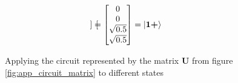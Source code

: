 \begin{figure}[H]
\begin{alignat*}{2}
\begin{bmatrix}
        \end{bmatrix}
        =
        \begin{bmatrix}
            0             \\
            0             \\
            \sqrt{0.5}    \\
            \sqrt{0.5}    \\
        \end{bmatrix}&=\ket{\mathbf{1}\textbf{+}}
    \end{alignat*}
    \caption{Applying the circuit represented by the matrix $\mathbf{U}$ from figure \ref{fig:app_circuit_matrix} to different states}
    \label{fig:app_applying_circuit}
\end{figure}
